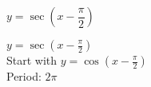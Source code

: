 {$y = \sec \left( x - \dfrac{\pi}{2} \right)$}
{$y = \sec \left( x - \frac{\pi}{2} \right)$ \\
Start with $y = \cos \left( x - \frac{\pi}{2} \right)$\\
Period: $2\pi$

\begin{center}
\end{center}
}
